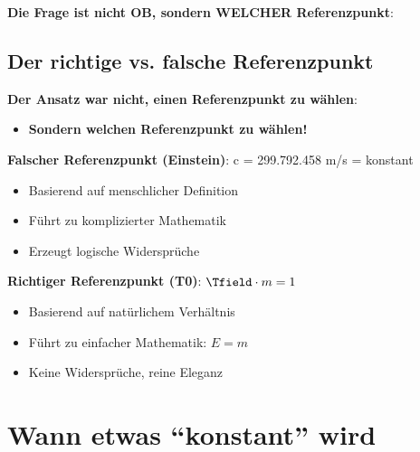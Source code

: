 	\textbf{Die Frage ist nicht OB, sondern WELCHER Referenzpunkt}:
	
	\begin{table}[htbp]
		\centering
		\caption{Vergleich der Referenzpunktsysteme}
	\end{table}
	
	\subsection{Der richtige vs. falsche Referenzpunkt}
	
	\textbf{Der Ansatz war nicht, einen Referenzpunkt zu wählen}:
	\begin{itemize}
		\item \textbf{Sondern welchen Referenzpunkt zu wählen!}
	\end{itemize}
	
	\textbf{Falscher Referenzpunkt (Einstein)}: c = 299.792.458 m/s = konstant
	\begin{itemize}
		\item Basierend auf menschlicher Definition
		\item Führt zu komplizierter Mathematik
		\item Erzeugt logische Widersprüche
	\end{itemize}
	
	\textbf{Richtiger Referenzpunkt (T0)}: $\Tfield \cdot m = 1$
	\begin{itemize}
		\item Basierend auf natürlichem Verhältnis
		\item Führt zu einfacher Mathematik: $E = m$
		\item Keine Widersprüche, reine Eleganz
	\end{itemize}
	
	\section{Wann etwas ``konstant'' wird}
	
